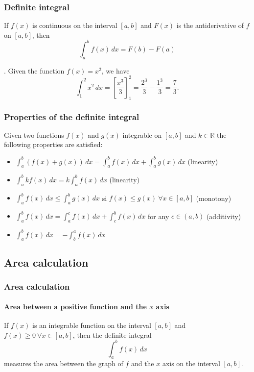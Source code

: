 \begin{frame}
\frametitle{Definite integral}
\begin{theorem}
If $f(x)$ is continuous on the interval $[a,b]$ and $F(x)$ is the antiderivative of $f$ on $[a,b]$, then
\[
\int_a^b f(x)\,dx = F(b)-F(a)
\]
\end{theorem}
. Given the function $f(x)=x^2$, we have
\[
\int_1^2 x^2\,dx = \left[\frac{x^3}{3}\right]_1^2 = \frac{2^3}{3}-\frac{1^3}{3} = \frac{7}{3}.
\]
\end{frame}


\begin{frame}
\frametitle{Properties of the definite integral}
Given two functions $f(x)$ and $g(x)$ integrable on $[a,b]$ and $k \in \mathbb{R}$ the following properties are satisfied:
\begin{itemize}
\item $\int_{a}^{b}(f(x)+g(x))\,dx=\int_{a}^{b}f(x)\,dx+\int_{a}^{b}g(x)\,dx$ (linearity)
\item $\int_{a}^{b}{kf(x)}\,dx=k\int_{a}^{b}{f(x)}\,dx$ (linearity)
\item $\int_{a}^{b}{f(x)\,dx} \leq \int_{a}^{b}{g(x)\,dx}$ si $f(x)\leq g(x)\ \forall x \in [a,b]$ (monotony)
\item $\int_{a}^{b}{f(x)\,dx} = \int_{a}^{c}{f(x)\,dx}+\int_{c}^{b}{f(x)\,dx}$ for any $c\in(a,b)$ (additivity)
\item $\int_a^b f(x)\,dx = -\int_b^a f(x)\,dx$
\end{itemize}
\end{frame}



\subsection{Area calculation}
\begin{frame}
\frametitle{Area calculation}
\framesubtitle{Area between a positive function and the $x$ axis}
If $f(x)$ is an integrable function on the interval $[a,b]$ and $f(x)\geq 0\ \forall x\in[a,b]$, then the definite integral 
\[\int_a^b f(x)\,dx\]
measures the area between the graph of $f$ and the $x$ axis on the interval $[a,b]$.
\begin{center}

\end{center}
\end{frame}


